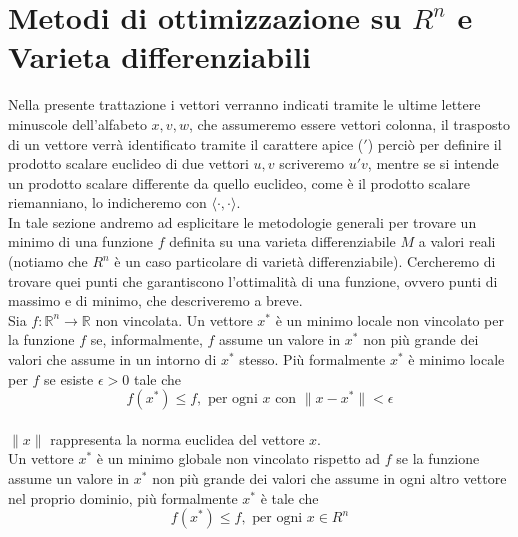 \documentclass[a4paper, 12pt]{article}
\begin{document}
\section{Metodi di ottimizzazione su $R^n$ e Varieta differenziabili}
Nella presente trattazione i vettori verranno indicati tramite le ultime lettere minuscole dell'alfabeto $x, v, w$, che assumeremo essere vettori colonna, il trasposto di un vettore verrà identificato tramite il carattere apice ($'$) perciò per definire il prodotto scalare euclideo di due vettori $u, v$ scriveremo $u'v$, mentre se si intende  un prodotto scalare differente da quello euclideo, come è il prodotto scalare riemanniano, lo indicheremo con $\langle \cdot,\cdot \rangle$.\\
In tale sezione andremo ad esplicitare le metodologie generali per trovare un minimo di una funzione $f$ definita su una varieta differenziabile $M$ a valori reali (notiamo che $R^n$ è un caso particolare di varietà differenziabile). Cercheremo di trovare quei punti che garantiscono l'ottimalità di una funzione, ovvero punti di massimo e di minimo, che descriveremo a breve.\\
Sia $f: \mathbb{R} ^n \to \mathbb{R}$ non vincolata.
Un vettore $x^\ast$ è un minimo locale non vincolato per la funzione $f$ se, informalmente, $f$ assume un valore in $x^\ast$ non più grande dei valori che assume in un intorno di $x^\ast$ stesso. Più formalmente $x^\ast$ è minimo locale per $f$ se esiste $\epsilon > 0$ tale che\\
\[f(x^\ast) \leq f, \mbox{ per ogni } x \mbox{ con } \parallel x - x^\ast \parallel < \epsilon\]\\
$\parallel x \parallel$ rappresenta la norma euclidea del vettore $x$.\\
Un vettore $x^\ast$ è un minimo globale non vincolato rispetto ad $f$ se la funzione assume un valore in $x^\ast$ non più grande dei valori che assume in ogni altro vettore nel proprio dominio, più formalmente $x^\ast$ è tale che\\
\[f(x^\ast) \leq f, \mbox{ per ogni } x \in R^n \]\\
\end{document}
